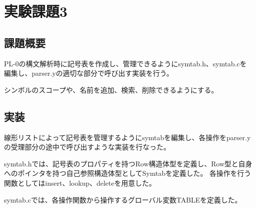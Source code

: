 \section{実験課題3}
\subsection{課題概要}
PL-0の構文解析時に記号表を作成し、管理できるようにsymtab.h、symtab.cを編集し、parser.yの適切な部分で呼び出す実装を行う。

シンボルのスコープや、名前を追加、検索、削除できるようにする。

\subsection{実装}
線形リストによって記号表を管理するようにsymtabを編集し、各操作をparser.yの受理部分の途中で呼び出すような実装を行なった。

symtab.hでは、記号表のプロパティを持つRow構造体型を定義し、Row型と自身へのポインタを持つ自己参照構造体型としてSymtabを定義した。
各操作を行う関数としてはinsert、lookup、deleteを用意した。


symtab.cでは、各操作関数から操作するグローバル変数TABLEを定義した。



